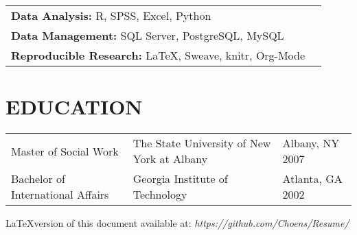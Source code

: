 \documentclass[line, margin, 10pt]{res}
\begin{document}
\begin{resume}
  \begin{tabular} {l l}
    {\bf Data Analysis:} R, SPSS, Excel, Python\\
    {\bf Data Management:} SQL Server, PostgreSQL, MySQL\\
    {\bf Reproducible Research:} \LaTeX, Sweave, knitr, Org-Mode\\
  \end{tabular}

  \section{EDUCATION}
  \begin{tabular} {p{1.5in} p{2.125in} p{.75in}}
    Master of Social Work & The State University of New  York at Albany & Albany, NY 2007 \\
    Bachelor of International Affairs & Georgia Institute of
    Technology & Atlanta, GA 2002 
  \end{tabular}

  \vspace{1in}
  \LaTeX version of this document available at: \emph{https://github.com/Choens/Resume/}

\end{resume}
\end{document}

